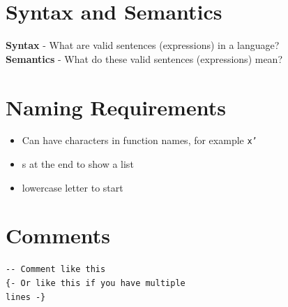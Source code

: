 \documentclass{article}[18pt]
\begin{document}
\section{Syntax and Semantics}
\textbf{Syntax} - What are valid sentences (expressions) in a language?\\
\textbf{Semantics} - What do these valid sentences (expressions) mean?
\section{Naming Requirements}
\begin{itemize}
	\item Can have characters in function names, for example \texttt{x'}
	\item s at the end to show a list
	\item lowercase letter to start
\end{itemize}
\section{Comments}
\begin{verbatim}
-- Comment like this
{- Or like this if you have multiple 
lines -}
\end{verbatim}
\end{document}
